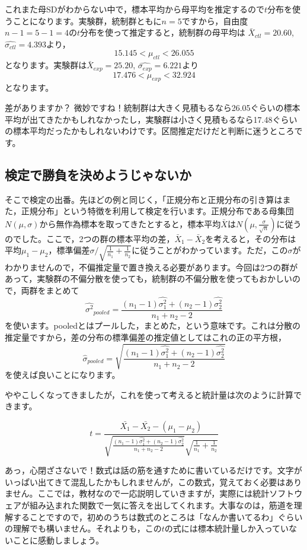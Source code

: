 \documentclass{ltjsarticle}
\begin{document}
これまた母SDがわからない中で，標本平均から母平均を推定するので$t$分布を使うことになります。実験群，統制群ともに$n=5$ですから，自由度$n-1=5-1=4$の$t$分布を使って推定すると，統制群の母平均は
$\bar{X}_{ctl} =20.60$,$\hat{\sigma_{ctl}}=4.393$より，
\[15.145 < \mu_{ctl}<26.055 \]
となります。実験群は$\bar{X}_{exp} = 25.20$,
$\hat{\sigma_{exp}}=6.221$より
\[17.476<\mu_{exp}< 32.924 \]
となります。

差がありますか？ 微妙ですね！統制群は大きく見積もるなら26.05ぐらいの標本平均が出てきたかもしれなかったし，実験群は小さく見積もるなら17.48ぐらいの標本平均だったかもしれないわけです。区間推定だけだと判断に迷うところです。
\subsection{検定で勝負を決めようじゃないか}
そこで検定の出番。先ほどの例と同じく，「正規分布と正規分布の引き算はまた，正規分布」という特徴を利用して検定を行います。正規分布である母集団$N(\mu,\sigma)$から無作為標本を取ってきたとすると，標本平均$\bar{X}$は$N(\mu,\frac{\sigma}{\sqrt{n}})$に従うのでした。ここで，2つの群の標本平均の差，$\bar{X}_1 - \bar{X}_2$を考えると，その分布は平均$\mu_1-\mu_2$，標準偏差$\sigma/\sqrt{\frac{1}{n_1}+\frac{1}{n_2}}$に従うことがわかっています。ただ，この$\sigma$がわかりませんので，不偏推定量で置き換える必要があります。今回は2つの群があって，実験群の不偏分散を使っても，統制群の不偏分散を使ってもおかしいので，両群をまとめて
\[ \hat{\sigma^2}_{pooled} = \frac{(n_1-1)\hat{\sigma_1^2}+(n_2-1)\hat{\sigma_2^2}}{n_1+n_2 - 2}\]
を使います。pooledとはプールした，まとめた，という意味です。これは分散の推定量ですから，差の分布の標準偏差の推定値としてはこれの正の平方根，
\[ \hat{\sigma}_{pooled} = \sqrt{\frac{(n_1-1)\hat{\sigma_1^2}+(n_2-1)\hat{\sigma_2^2}}{n_1+n_2 - 2}}\]を使えば良いことになります。

ややこしくなってきましたが，これを使って考えると統計量は次のように計算できます。

\[ t = \frac{\bar{X_1}-\bar{X_2}-(\mu_1-\mu_2)}{\sqrt{\frac{(n_1-1)\hat{\sigma_1^2}+(n_2-1)\hat{\sigma_2^2}}{n_1+n_2 - 2}}\sqrt{\frac{1}{n_1}+\frac{1}{n_2}}}\]

あっ，心閉ざさないで！数式は話の筋を通すために書いているだけです。文字がいっぱい出てきて混乱したかもしれませんが，この数式，覚えておく必要はありません。ここでは，教材なので一応説明していきますが，実際には統計ソフトウェアが組み込まれた関数で一気に答えを出してくれます。大事なのは，筋道を理解することですので，初めのうちは数式のところは「なんか書いてるわ」ぐらいの理解でも構いません。それよりも，この$t$の式には標本統計量しか入っていないことに感動しましょう。
\end{document}
